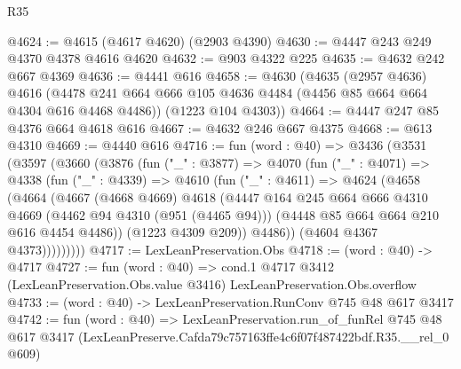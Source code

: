 \begin{lexlean}{R35}
\begin{coremodule}
@4624 := @4615 (@4617 @4620) (@2903 @4390)
@4630 := @4447 @243 @249 @4370 @4378 @4616 @4620
@4632 := @903 @4322 @225
@4635 := @4632 @242 @667 @4369
@4636 := @4441 @616
@4658 := @4630
    (@4635
      (@2957 @4636)
      @4616
      (@4478 @241 @664 @666 @105 @4636 @4484 (@4456 @85 @664 @664 @4304 @616 @4468 @4486))
      (@1223 @104 @4303))
@4664 := @4447 @247 @85 @4376 @664 @4618 @616
@4667 := @4632 @246 @667 @4375
@4668 := @613 @4310
@4669 := @4440 @616
@4716 := fun (word : @40) =>
  @3436
    (@3531
      (@3597
        (@3660
          (@3876
            (fun ("_" : @3877) =>
            @4070
              (fun ("_" : @4071) =>
              @4338
                (fun ("_" : @4339) =>
                @4610
                  (fun ("_" : @4611) =>
                  @4624
                    (@4658
                      (@4664
                        (@4667
                          (@4668 @4669)
                          @4618
                          (@4447
                            @164
                            @245
                            @664
                            @666
                            @4310
                            @4669
                            (@4462 @94 @4310 (@951 (@4465 @94)))
                            (@4448 @85 @664 @664 @210 @616 @4454 @4486))
                          (@1223 @4309 @209))
                        @4486))
                    (@4604 @4367 @4373)))))))))
@4717 := LexLeanPreservation.Obs
@4718 := (word : @40) -> @4717
@4727 := fun (word : @40) =>
  cond.{1} @4717 @3412 (LexLeanPreservation.Obs.value @3416) LexLeanPreservation.Obs.overflow
@4733 := (word : @40) -> LexLeanPreservation.RunConv @745 @48 @617 @3417
@4742 := fun (word : @40) =>
  LexLeanPreservation.run_of_funRel
    @745
    @48
    @617
    @3417
    (LexLeanPreserve.Cafda79c757163ffe4c6f07f487422bdf.R35.__rel_0 @609)
\end{coremodule}
\end{lexlean}
